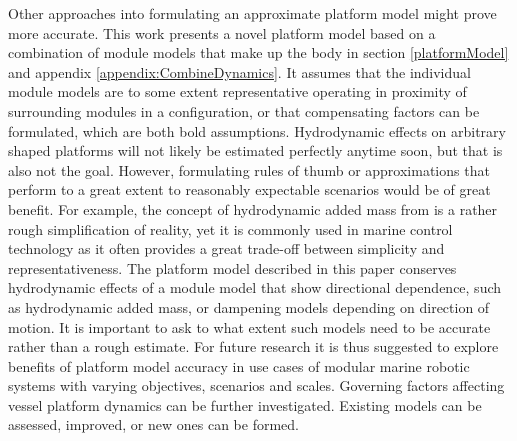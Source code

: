 Other approaches into formulating an approximate platform model might prove more accurate. This work presents a novel platform model based on a combination of module models that make up the body in section \ref{platformModel} and appendix \ref{appendix:CombineDynamics}. It assumes that the individual module models are to some extent representative operating in proximity of surrounding modules in a configuration, or that compensating factors can be formulated, which are both bold assumptions. Hydrodynamic effects on arbitrary shaped platforms will not likely be estimated perfectly anytime soon, but that is also not the goal. However, formulating rules of thumb or approximations that perform to a great extent to reasonably expectable scenarios would be of great benefit. For example, the concept of hydrodynamic added mass from  \citet{humphreys1978prediction} is a rather rough simplification of reality, yet it is commonly used in marine control technology as it often provides a great trade-off between simplicity and representativeness. The platform model described in this paper conserves hydrodynamic effects of a module model that show directional dependence, such as hydrodynamic added mass, or dampening models depending on direction of motion. 
It is important to ask to what extent such models need to be accurate rather than a rough estimate. For future research it is thus suggested to explore benefits of platform model accuracy in use cases of modular marine robotic systems with varying objectives, scenarios and scales. Governing factors affecting vessel platform dynamics can be further investigated. Existing models can be assessed, improved, or new ones can be formed. 

